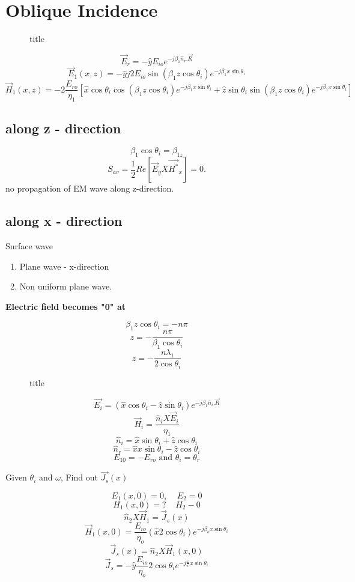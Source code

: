 
\section{Oblique Incidence}

\begin{figure}[H]
    \centering
    \caption{title}
    \label{fig:oblique}
\end{figure}
\[
    \vec{E}_r = - \hat{y} E_{io} e^{-j\beta_1 \hat{n}_r . \vec{R} } 
\]
\[
    \vec{E}_1 (x,z) = -\hat{y} j 2 E_{io} \sin (\beta_1 z \cos \theta_i) e^{-j \beta_1 x \sin \theta_i}
\]
\[
    \vec{H}_1 (x,z) = -2 \frac{E_{ro} }{\eta_1}[\hat{x} \cos \theta_i \cos (\beta_1 z \cos \theta_i)e^{-j \beta_1 x \sin \theta_i}+ \hat{z} \sin \theta_i \sin (\beta_1 z \cos  \theta_i)e^{-j \beta_1 x \sin \theta_i}]
\]
\subsection{along z - direction}
\[
    \beta_1 \cos \theta_i = \beta_{1z} 
\]
\[
    S_{av }  =  \frac{1}{2} Re[\vec{E}_y X \vec{H^*}_x] = 0. 
\]
no propagation of EM wave along z-direction. 
\subsection{along x - direction}
Surface wave 
\begin{enumerate}
    \item Plane wave - x-direction
    \item Non uniform plane wave. 
\end{enumerate}
\textbf{Electric field becomes "0" at} 

\[
    \beta_{1}z \cos \theta_i = - n \pi
\]
\[
    z = - \frac{n \pi }{\beta_1 \cos \theta_i}
\]
\[
    \boxed{z = -\frac{n \lambda_1}{2 \cos  \theta_i}} 
\]
\begin{figure}[H]
    \centering
   \caption{title}
\end{figure}
\label{fig:field}

\[
    \vec{E_i} = (\hat{x}\cos \theta_i - \hat{z}  \sin  \theta_i )e^{-j \beta_1 \hat{n}_i . \vec{R}}
\]
\[
    \vec{H}_i = \frac{\hat{n}_i X \vec{E}_i}{\eta_1}
\]
\[
    \hat{n} _i = \hat{x} \sin \theta_i + \hat{z} \cos \theta_i
\]
\[
    \hat{n} _r = \hat{x}  x \sin \theta_i - \hat{z}  \cos\theta_i
\]
\[
    \boxed{E_{10} = - E_{ro}  \text{ and } \theta_i = \theta_r}
\]
\begin{eg}
Given \(\theta_i\)  and \(\omega\), Find out \(\vec{J_s}(x)\) 
\begin{answer}
    \[
        E_1(x,0) = 0, \;\;\;\; E_2 = 0
    \]
    \[
        H_1(x,0) = ? \;\;\;\; H_2 - 0
    \]
    \[
        \hat{n} _2 X \vec{H}_1 = \vec{J}_s (x)
    \]
    \[
        \vec{H}_1(x,0) = \frac{E_{io} }{\eta_o}(\hat{x} 2 \cos \theta_i)e^{-j \beta_o x \sin  \theta_i}
    \]
    \[
        \vec{J}_s (x) = \hat{n}_2 X \vec{H}_1 (x,0)
    \]
    \[
        \vec{J}_s = - \hat{y} \frac{E_{io} }{\eta_o} 2 \cos \theta_i e^{- j \frac{\omega}{c} x \sin \theta_i}
    \]
\end{answer}
\end{eg}